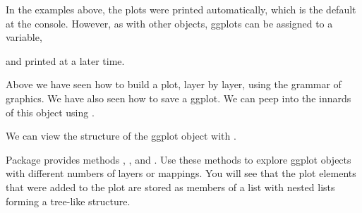 \documentclass[krantz2]{krantz}\usepackage{knitr}
\begin{document}
\begin{warningbox}
In the examples above, the plots were printed automatically, which is the default at the \Rlang console. However, as with other \Rlang objects, ggplots can be assigned to a variable,

\begin{knitrout}\footnotesize
{}\color{fgcolor}\begin{kframe}
\begin{alltt}
 \hlkwb{<-} \hlstd{(} 
            \hlstd{(}    \hlopt{+}
       \hlstd{()}
\end{alltt}
\end{kframe}
\end{knitrout}

and printed at a later time.

\begin{knitrout}\footnotesize
{}\color{fgcolor}\begin{kframe}
\begin{alltt}
\end{alltt}
\end{kframe}
\end{knitrout}
\end{warningbox}

\begin{advplayground}
Above we have seen how to build a plot, layer by layer, using the grammar of graphics. We have also seen how to save a ggplot. We can peep into the innards of this object using .

\begin{knitrout}\footnotesize
{}\color{fgcolor}\begin{kframe}
\begin{alltt}
\end{alltt}
\end{kframe}
\end{knitrout}
We can view the structure of the ggplot object with .

Package  provides methods , ,  and  . Use these methods to explore ggplot objects with different numbers of layers or mappings. You will see that the plot elements that were added to the plot are stored as members of a list with nested lists forming a tree-like structure.
\end{advplayground}
\end{document}
